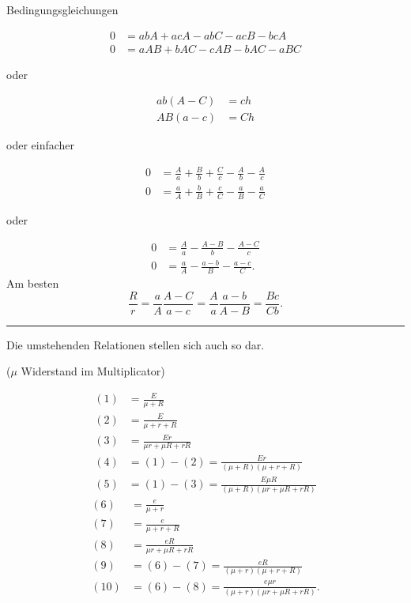 \begin{center}Bedingungsgleichungen\end{center}
\[
\begin{aligned}
0&=abA+acA-abC-acB-bcA\\
0&=aAB+bAC-cAB-bAC-aBC
\end{aligned}
\]
\begin{center}oder\end{center}
\[
\begin{aligned}
ab(A-C)&=ch\\
AB(a-c)&=Ch
\end{aligned}
\]
\begin{center}oder einfacher\end{center}
\[
\begin{aligned}
0&=\frac Aa+\frac Bb+\frac Cc-\frac Ab-\frac Ac\\[1ex]
0&=\frac aA+\frac bB+\frac cC-\frac aB-\frac aC
\end{aligned}
\]
\begin{center}oder\end{center}
\[
\begin{aligned}
0&=\frac Aa-\frac{A-B}b-\frac{A-C}c\\[1ex]
0&=\frac aA-\frac{a-b}B-\frac{a-c}C.
\end{aligned}
\]
\noindent Am besten
\[
\frac Rr=\frac aA\frac{A-C}{a-c}=\frac Aa\frac{a-b}{A-B}=\frac{Bc}{Cb}.
\]
\begin{center}\rule{.23\textwidth}{.4pt}\end{center}
\noindent{\small [S. 210]}
\par\indent Die umstehenden Relationen stellen sich auch so dar.
\begin{center}(\(\mu\) Widerstand im Multiplicator)\end{center}
\[
\begin{aligned}
(1)&=\frac E{\mu+R}\\[1ex]
(2)&=\frac E{\mu+r+R}\\[1ex]
(3)&=\frac{Er}{\mu r+\mu R+rR}\\[1ex]
(4)&=(1)-(2)=\frac{Er}{(\mu+R)(\mu+r+R)}\\[1ex]
(5)&=(1)-(3)=\frac{E\mu R}{(\mu+R)(\mu r+\mu R+rR)}
\end{aligned}
\]
\[
\begin{aligned}
(6)&=\frac e{\mu+r}\\[1ex]
(7)&=\frac e{\mu+r+R}\\[1ex]
(8)&=\frac{eR}{\mu r+\mu R+rR}\\[1ex]
(9)&=(6)-(7)=\frac{eR}{(\mu+r)(\mu+r+R)}\\[1ex]
(10)&=(6)-(8)=\frac{e\mu r}{(\mu+r)(\mu r+\mu R+rR)}.
\end{aligned}
\]
